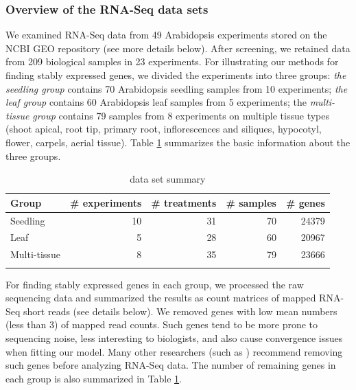 \documentclass[11pt, a4paper]{article}
\begin{document}
\subsubsection*{Overview of the RNA-Seq data sets}
We examined RNA-Seq data from 49 Arabidopsis experiments stored on the NCBI
GEO repository (see more details below). After screening, we retained data
from 209 biological samples in 23 experiments.  For illustrating our methods
for finding stably expressed genes, we divided the experiments into three
groups: \textit{the seedling group} contains  70 Arabidopsis seedling samples
from 10 experiments; \textit{ the leaf group} contains 60 Arabidopsis leaf
samples from 5 experiments;  the \textit{multi-tissue group} contains 79
samples from 8 experiments on multiple tissue types (shoot apical, root tip,
primary root, inflorescences and siliques, hypocotyl, flower, carpels, aerial
tissue).  Table \ref{table:TableSet3} summarizes the basic information about
the three groups.
\begin{table}[h]
    \centering
    \caption[3.2]{data set summary}
    \begin{tabular}{lrrrr} \hline
	Group & \#  experiments & \# treatments  & \# samples & \# genes \\ \hline
	Seedling &10 & 31 &70  &24379  \\
	Leaf &5 & 28 & 60 &20967  \\
	Multi-tissue &8 &35  &79  & 23666\\ \hline
	\label{table:TableSet3}
    \end{tabular}
\end{table}

For finding stably expressed genes in each group, we processed the raw
sequencing data and summarized the results as count matrices of mapped RNA-Seq
short reads (see details below).  We removed genes with low mean numbers (less
than 3) of mapped read counts.  Such genes tend to be more prone to sequencing
noise, less interesting to biologists, and also cause convergence issues when
fitting our model. Many other researchers (such as \citealt{anders2013count})
recommend removing such genes before analyzing RNA-Seq data.  The number of
remaining genes in each group is also summarized in Table
\ref{table:TableSet3}.
\end{document}
